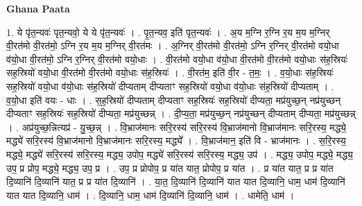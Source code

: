 \documentclass[17pt]{extarticle}
\begin{document}
\textbf{Ghana Paata } \newline

1. ये पृ॑त॒न्यवः॑ पृत॒न्यवो॒ ये ये पृ॑त॒न्यवः॑ । . पृ॒त॒न्यव॒ इति॑ पृत॒न्यवः॑ । . अ॒य म॒ग्नि र॒ग्नि र॒य म॒य म॒ग्निर् वी॒रत॑मो वी॒रत॑मो॒ ऽग्नि र॒य म॒य म॒ग्निर् वी॒रत॑मः । . अ॒ग्निर् वी॒रत॑मो वी॒रत॑मो॒ ऽग्नि र॒ग्निर् वी॒रत॑मो वयो॒धा व॑यो॒धा वी॒रत॑मो॒ ऽग्नि र॒ग्निर् वी॒रत॑मो वयो॒धाः । . वी॒रत॑मो वयो॒धा व॑यो॒धा वी॒रत॑मो वी॒रत॑मो वयो॒धाः स॑ह॒स्रियः॑ सह॒स्रियो॑ वयो॒धा वी॒रत॑मो वी॒रत॑मो वयो॒धाः स॑ह॒स्रियः॑ । . वी॒रत॑म॒ इति॑ वी॒र - त॒मः॒ । . व॒यो॒धाः स॑ह॒स्रियः॑ सह॒स्रियो॑ वयो॒धा व॑यो॒धाः स॑ह॒स्रियो॑ दीप्यताम् दीप्यताꣳ सह॒स्रियो॑ वयो॒धा व॑यो॒धाः स॑ह॒स्रियो॑ दीप्यताम् । . व॒यो॒धा इति॑ वयः - धाः । . स॒ह॒स्रियो॑ दीप्यताम् दीप्यताꣳ सह॒स्रियः॑ सह॒स्रियो॑ दीप्यता॒ मप्र॑युच्छ॒न् नप्र॑युच्छन् दीप्यताꣳ सह॒स्रियः॑ सह॒स्रियो॑ दीप्यता॒ मप्र॑युच्छन्न् । . दी॒प्य॒ता॒ मप्र॑युच्छ॒न् नप्र॑युच्छन् दीप्यताम् दीप्यता॒ मप्र॑युच्छन्न् । . अप्र॑युच्छ॒न्नित्यप्र॑ - यु॒च्छ॒न्न् । . वि॒भ्राज॑मानः सरि॒रस्य॑ सरि॒रस्य॑ वि॒भ्राज॑मानो वि॒भ्राज॑मानः सरि॒रस्य॒ मद्ध्ये॒ मद्ध्ये॑ सरि॒रस्य॑ वि॒भ्राज॑मानो वि॒भ्राज॑मानः सरि॒रस्य॒ मद्ध्ये᳚ । . वि॒भ्राज॑मान॒ इति॑ वि - भ्राज॑मानः । . स॒रि॒रस्य॒ मद्ध्ये॒ मद्ध्ये॑ सरि॒रस्य॑ सरि॒रस्य॒ मद्ध्य॒ उपोप॒ मद्ध्ये॑ सरि॒रस्य॑ सरि॒रस्य॒ मद्ध्य॒ उप॑ । . मद्ध्य॒ उपोप॒ मद्ध्ये॒ मद्ध्य॒ उप॒ प्र प्रोप॒ मद्ध्ये॒ मद्ध्य॒ उप॒ प्र । . उप॒ प्र प्रोपोप॒ प्र या॑त यात॒ प्रोपोप॒ प्र या॑त । . प्र या॑त यात॒ प्र प्र या॑त दि॒व्यानि॑ दि॒व्यानि॑ यात॒ प्र प्र या॑त दि॒व्यानि॑ । . या॒त॒ दि॒व्यानि॑ दि॒व्यानि॑ यात यात दि॒व्यानि॒ धाम॒ धाम॑ दि॒व्यानि॑ यात यात दि॒व्यानि॒ धाम॑ । . दि॒व्यानि॒ धाम॒ धाम॑ दि॒व्यानि॑ दि॒व्यानि॒ धाम॑ । . धामेति॒ धाम॑ । \newline
\end{document}
